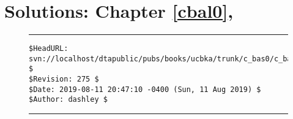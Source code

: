 
\chapter[Solutions: \cbalzeroxrefcomma{}Chapter \ref{cbal0}]
        {Solutions: \cbalzeroxrefcomma{}Chapter \ref{cbal0}, \cbalzerolongtitle{}}

\label{cbas0}


\vfill
\noindent\begin{figure}[!b]
\noindent\rule[-0.25in]{\textwidth}{1pt}
\begin{tiny}
\begin{verbatim}
$HeadURL: svn://localhost/dtapublic/pubs/books/ucbka/trunk/c_bas0/c_bas0.tex $
$Revision: 275 $
$Date: 2019-08-11 20:47:10 -0400 (Sun, 11 Aug 2019) $
$Author: dashley $
\end{verbatim}
\end{tiny}
\noindent\rule[0.25in]{\textwidth}{1pt}
\end{figure}

%
